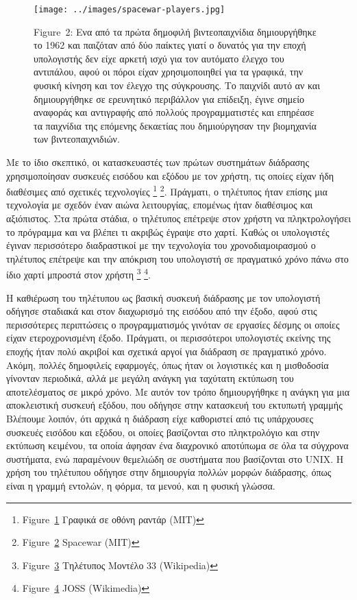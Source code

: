 \documentclass[
]{article}
\begin{document}
\leavevmode{}%
\begin{figure}
\hypertarget{fig:spacewar-players}{%
\centering
\texttt{[image: ../images/spacewar-players.jpg]}
\caption{Figure~2: Ενα από τα πρώτα δημοφιλή βιντεοπαιχνίδια
δημιουργήθηκε το 1962 και παιζόταν από δύο παίκτες γιατί ο δυνατός για
την εποχή υπολογιστής δεν είχε αρκετή ισχύ για τον αυτόματο έλεγχο του
αντιπάλου, αφού οι πόροι είχαν χρησιμοποιηθεί για τα γραφικά, την φυσική
κίνηση και τον έλεγχο της σύγκρουσης. Το παιχνίδι αυτό αν και
δημιουργήθηκε σε ερευνητικό περιβάλλον για επίδειξη, έγινε σημείο
αναφοράς και αντιγραφής από πολλούς προγραμματιστές και επηρέασε τα
παιχνίδια της επόμενης δεκαετίας που δημιούργησαν την βιομηχανία των
βιντεοπαιχνιδιών.}\label{fig:spacewar-players}
}
\end{figure}

Με το ίδιο σκεπτικό, οι κατασκευαστές των πρώτων συστημάτων διάδρασης
χρησιμοποίησαν συσκευές εισόδου και εξόδου με τον χρήστη, τις οποίες
είχαν ήδη διαθέσιμες από σχετικές τεχνολογίες \footnote{Figure~\protect\hyperlink{fig:sage-radar}{1}
  Γραφικά σε οθόνη ραντάρ (MIT)} \footnote{Figure~\protect\hyperlink{fig:spacewar-players}{2}
  Spacewar (MIT)}. Πράγματι, ο τηλέτυπος ήταν επίσης μια τεχνολογία με
σχεδόν έναν αιώνα λειτουργίας, επομένως ήταν διαθέσιμος και αξιόπιστος.
Στα πρώτα στάδια, ο τηλέτυπος επέτρεψε στον χρήστη να πληκτρολογήσει το
πρόγραμμα και να βλέπει τι ακριβώς έγραψε στο χαρτί. Καθώς οι
υπολογιστές έγιναν περισσότερο διαδραστικοί με την τεχνολογία του
χρονοδιαμοιρασμού ο τηλέτυπος επέτρεψε και την απόκριση του υπολογιστή
σε πραγματικό χρόνο πάνω στο ίδιο χαρτί μπροστά στον χρήστη \footnote{Figure~\protect\hyperlink{fig:tty-model33}{3}
  Τηλέτυπος Μοντέλο 33 (Wikipedia)} \footnote{Figure~\protect\hyperlink{fig:joss}{4}
  JOSS (Wikimedia)}.

Η καθιέρωση του τηλέτυπου ως βασική συσκευή διάδρασης με τον υπολογιστή
οδήγησε σταδιακά και στον διαχωρισμό της εισόδου από την έξοδο, αφού
στις περισσότερες περιπτώσεις ο προγραμματισμός γινόταν σε εργασίες
δέσμης οι οποίες είχαν ετεροχρονισμένη έξοδο. Πράγματι, οι περισσότεροι
υπολογιστές εκείνης της εποχής ήταν πολύ ακριβοί και σχετικά αργοί για
διάδραση σε πραγματικό χρόνο. Ακόμη, πολλές δημοφιλείς εφαρμογές, όπως
ήταν οι λογιστικές και η μισθοδοσία γίνονταν περιοδικά, αλλά με μεγάλη
ανάγκη για ταχύτατη εκτύπωση του αποτελέσματος σε μικρό χρόνο. Με αυτόν
τον τρόπο δημιουργήθηκε η ανάγκη για μια αποκλειστική συσκευή εξόδου,
που οδήγησε στην κατασκευή του εκτυπωτή γραμμής Βλέπουμε λοιπόν, ότι
αρχικά η διάδραση είχε καθοριστεί από τις υπάρχουσες συσκευές εισόδου
και εξόδου, οι οποίες βασίζονται στο πληκτρολόγιο και στην εκτύπωση
κειμένου, τα οποία άφησαν ένα διαχρονικό αποτύπωμα σε όλα τα σύγχρονα
συστήματα, ενώ παραμένουν θεμελιώδη σε συστήματα που βασίζονται στο
UNIX. Η χρήση του τηλέτυπου οδήγησε στην δημιουργία πολλών μορφών
διάδρασης, όπως είναι η γραμμή εντολών, η φόρμα, τα μενού, και η φυσική
γλώσσα.
\end{document}
